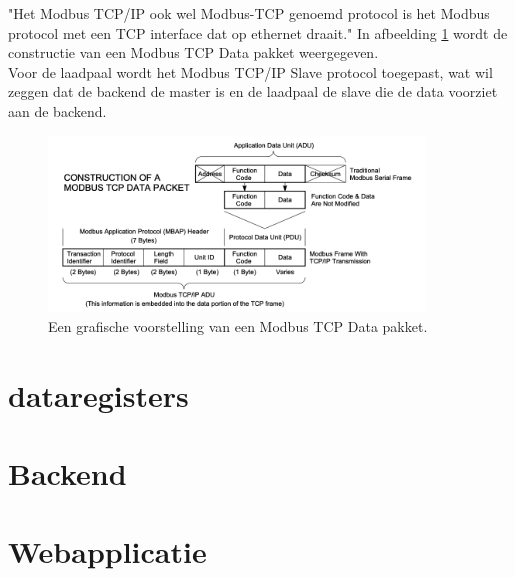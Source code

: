 "Het Modbus TCP/IP ook wel Modbus-TCP genoemd protocol is het Modbus protocol met een TCP interface dat op ethernet draait." \autocite{Acromag2005} In afbeelding \ref{fig:modbus-data-pakket} wordt de constructie van een Modbus TCP Data pakket weergegeven.\\

Voor de laadpaal wordt het Modbus TCP/IP Slave protocol toegepast, wat wil zeggen dat de backend de master is en de laadpaal de slave die de data voorziet aan de backend.

\begin{figure}[h]
    \includegraphics[width=10cm]{./graphics/Modbus-TCP-schema.png}
    \caption{Een grafische voorstelling van een Modbus TCP Data pakket. \autocite{Acromag2005}}
    \label{fig:modbus-data-pakket}
\end{figure}

\section{dataregisters}
\label{sec:stand-van-zaken-dataregisters}

\section{Backend}
\label{sec:stand-van-zaken-backend}

\section{Webapplicatie}
\label{sec:stand-van-zaken-webapplicatie}
